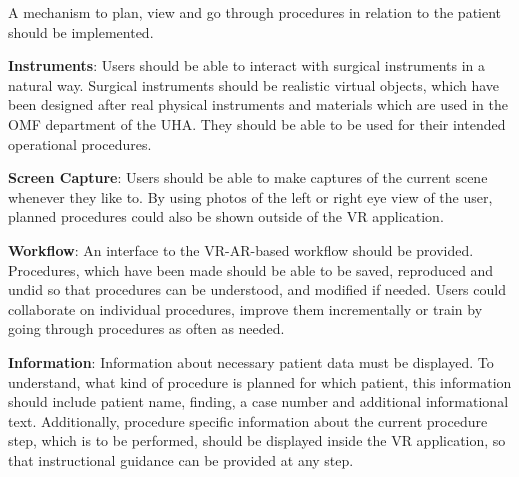\begin{compactenum}[label=(\textbf{\Roman*})]
\begin{compactenum}[label=(\textbf{\roman*})]
        \item \label{req::F3.7}A mechanism to plan, view and go through procedures in relation to the patient should be implemented.  
    \end{compactenum}
    \item \label{req::F4}\textbf{Instruments}: Users should be able to interact with surgical instruments in a natural way.
    Surgical instruments should be realistic virtual objects, which have been designed after real physical instruments and materials which are used in the OMF department of the UHA.
    They should be able to be used for their intended operational procedures.
    \item \label{req::F5}\textbf{Screen Capture}: Users should be able to make captures of the current scene whenever they like to.
    By using photos of the left or right eye view of the user, planned procedures could also be shown outside of the VR application. 
    \item \label{req::F6}\textbf{Workflow}: An interface to the VR-AR-based workflow should be provided.
    Procedures, which have been made should be able to be saved, reproduced and undid so that procedures can be understood, and modified if needed.
    Users could collaborate on individual procedures, improve them incrementally or train by going through procedures as often as needed.
    \item \label{req::F7}\textbf{Information}: Information about necessary patient data must be displayed.
    To understand, what kind of procedure is planned for which patient, this information should include patient name, finding, a case number and additional informational text.
    Additionally, procedure specific information about the current procedure step, which is to be performed, should be displayed inside the VR application, so that instructional guidance can 
    be provided at any step.
\end{compactenum}